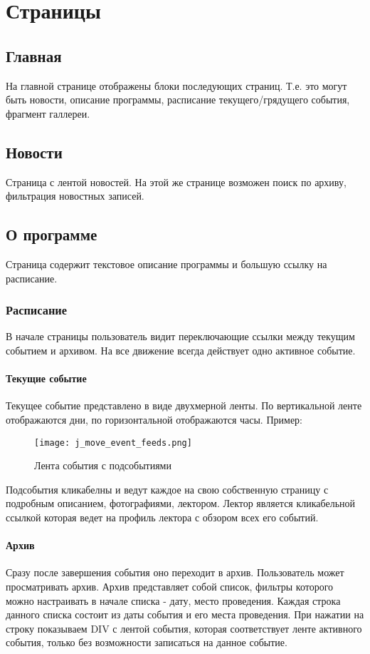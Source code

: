 \documentclass[DIV=calc, paper=a4, fontsize=11pt]{scrartcl} %
\begin{document}
\section{Страницы}

\subsection{Главная}

На главной странице отображены блоки последующих страниц. Т.е. это могут быть новости, описание программы, расписание текущего/грядущего события, фрагмент галлереи.

\subsection{Новости}
Страница с лентой новостей. На этой же странице возможен поиск по архиву, фильтрация новостных записей.

\subsection{О программе}
Страница содержит текстовое описание программы и большую ссылку на расписание.
\subsubsection{Расписание}
В начале страницы пользователь видит переключающие ссылки между текущим событием и архивом. На все движение всегда действует одно активное событие.

\paragraph{Текущие событие}
Текущее событие представлено в виде двухмерной ленты. По вертикальной ленте отображаются дни, по горизонтальной отображаются часы. Пример:
        \begin{figure}[H]
        \centering
        \texttt{[image: j\_move\_event\_feeds.png]}
        \caption{Лента события с подсобытиями\label{fig:j_move_event_feeds.png}}
        \end{figure}

Подсобытия кликабелны и ведут каждое на свою собственную страницу с подробным описанием, фотографиями, лектором. Лектор является кликабельной ссылкой которая ведет на профиль лектора с обзором всех его событий.
        
\paragraph{Архив \label{archive}} 
Сразу после завершения события оно переходит в архив. Пользователь может просматривать архив. Архив представляет собой список, фильтры которого можно настраивать в начале списка - дату, место проведения. Каждая строка данного списка состоит из даты события и его места проведения. При нажатии на строку показываем DIV с лентой события, которая соответствует ленте активного события, только без возможности записаться на данное событие.
\end{document}
